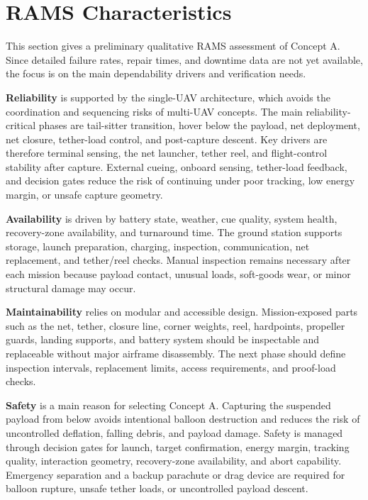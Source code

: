 
\section{RAMS Characteristics}

This section gives a preliminary qualitative RAMS assessment of Concept A. Since detailed failure rates, repair times, and downtime data are not yet available, the focus is on the main dependability drivers and verification needs.

\textbf{Reliability} is supported by the single-UAV architecture, which avoids the coordination and sequencing risks of multi-UAV concepts. The main reliability-critical phases are tail-sitter transition, hover below the payload, net deployment, net closure, tether-load control, and post-capture descent. Key drivers are therefore terminal sensing, the net launcher, tether reel, and flight-control stability after capture. External cueing, onboard sensing, tether-load feedback, and decision gates reduce the risk of continuing under poor tracking, low energy margin, or unsafe capture geometry.

\textbf{Availability} is driven by battery state, weather, cue quality, system health, recovery-zone availability, and turnaround time. The ground station supports storage, launch preparation, charging, inspection, communication, net replacement, and tether/reel checks. Manual inspection remains necessary after each mission because payload contact, unusual loads, soft-goods wear, or minor structural damage may occur.

\textbf{Maintainability} relies on modular and accessible design. Mission-exposed parts such as the net, tether, closure line, corner weights, reel, hardpoints, propeller guards, landing supports, and battery system should be inspectable and replaceable without major airframe disassembly. The next phase should define inspection intervals, replacement limits, access requirements, and proof-load checks.

\textbf{Safety} is a main reason for selecting Concept A. Capturing the suspended payload from below avoids intentional balloon destruction and reduces the risk of uncontrolled deflation, falling debris, and payload damage. Safety is managed through decision gates for launch, target confirmation, energy margin, tracking quality, interaction geometry, recovery-zone availability, and abort capability. Emergency separation and a backup parachute or drag device are required for balloon rupture, unsafe tether loads, or uncontrolled payload descent.

